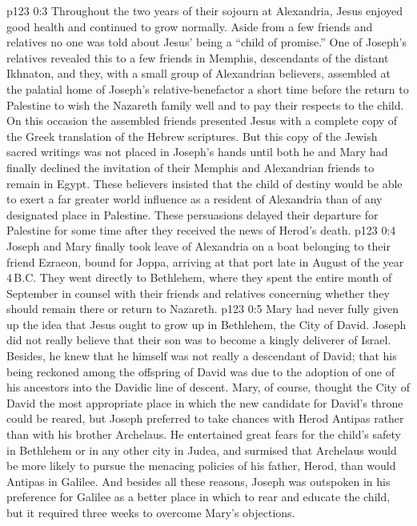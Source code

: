 \vs p123 0:3 Throughout the two years of their sojourn at Alexandria, Jesus enjoyed good health and continued to grow normally. Aside from a few friends and relatives no one was told about Jesus’ being a “child of promise.” One of Joseph’s relatives revealed this to a few friends in Memphis, descendants of the distant Ikhnaton, and they, with a small group of Alexandrian believers, assembled at the palatial home of Joseph’s relative\hyp{}benefactor a short time before the return to Palestine to wish the Nazareth family well and to pay their respects to the child. On this occasion the assembled friends presented Jesus with a complete copy of the Greek translation of the Hebrew scriptures. But this copy of the Jewish sacred writings was not placed in Joseph’s hands until both he and Mary had finally declined the invitation of their Memphis and Alexandrian friends to remain in Egypt. These believers insisted that the child of destiny would be able to exert a far greater world influence as a resident of Alexandria than of any designated place in Palestine. These persuasions delayed their departure for Palestine for some time after they received the news of Herod’s death.
\vs p123 0:4 \pc Joseph and Mary finally took leave of Alexandria on a boat belonging to their friend Ezraeon, bound for Joppa, arriving at that port late in August of the year 4\,B.C. They went directly to Bethlehem, where they spent the entire month of September in counsel with their friends and relatives concerning whether they should remain there or return to Nazareth.
\vs p123 0:5 Mary had never fully given up the idea that Jesus ought to grow up in Bethlehem, the City of David. Joseph did not really believe that their son was to become a kingly deliverer of Israel. Besides, he knew that he himself was not really a descendant of David; that his being reckoned among the offspring of David was due to the adoption of one of his ancestors into the Davidic line of descent. Mary, of course, thought the City of David the most appropriate place in which the new candidate for David’s throne could be reared, but Joseph preferred to take chances with Herod Antipas rather than with his brother Archelaus. He entertained great fears for the child’s safety in Bethlehem or in any other city in Judea, and surmised that Archelaus would be more likely to pursue the menacing policies of his father, Herod, than would Antipas in Galilee. And besides all these reasons, Joseph was outspoken in his preference for Galilee as a better place in which to rear and educate the child, but it required three weeks to overcome Mary’s objections.
